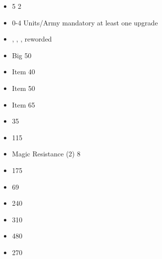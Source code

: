 \largefontsize{}

\subtitle{2023 balance \betaname{} 2 hotfix 1}
\begin{itemize}
        \item \mercenaryveterans{} \magicresistance{} 5 \costdown{} 2
\end{itemize}

\subtitle{2023 balance \betaname{} 2}
\begin{itemize}
        \item \mercenaryveterans{} 0-4 Units/Army \wordand{} mandatory at least one upgrade
        \item \cultleader, \animalmaster, \freezingaura, \bigbrother{} reworded
        \item Big \ATname{} \hoardmaster{} 50 
        \item \specialTYPE{} Item \viperscurse{} 40 
        \item \specialTYPE{} Item \heartripper{} 50 
        \item \specialTYPE{} Item \pennantofthegreatgrasssky{} 65 
        \item \mammothhunter{} \tusker{} 35 
        \item \scraplings{} \basecost{} 115 
        \item \mercenaryveterans{} Magic Resistance (2) 8 
        \item \bombardiers{} \basecost{} 175 
        \item \bombardiers{} \extramodel{} 69 
        \item \scratapult{} \basecost{} 240 
        \item \thundercannon{} \basecost{} 310 
        \item \rockaurochs{} \basecost{} 480 
        \item \slavegiant{} \basecost{} 270 
\end{itemize}
